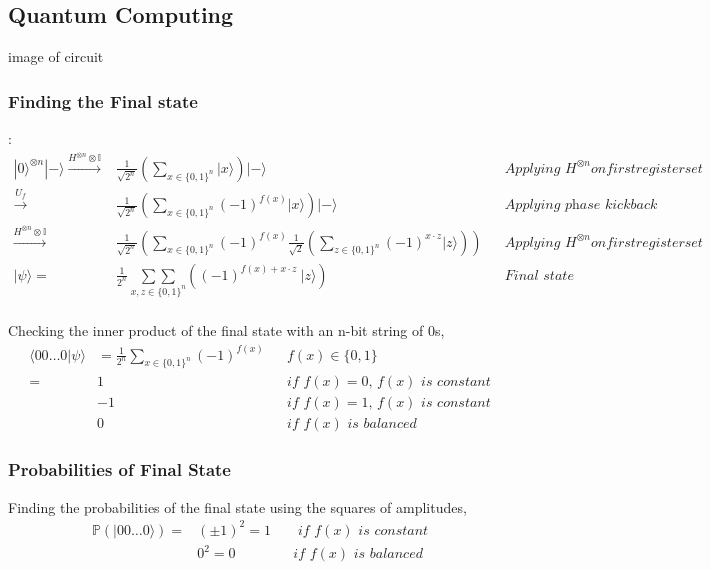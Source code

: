 \documentclass{article}
\begin{document}
    \subsection{Quantum Computing}
    image of circuit
    \\
    \subsubsection{Finding the Final state}:
    \begin{align*}
        |0\rangle^{\otimes n}|-\rangle \xrightarrow{H^{\otimes n} \otimes \mathbb{I}} & \frac{1}{\sqrt{2^n}} \left( \sum_{x \in \{0,1\}^n} |x\rangle \right) |-\rangle && \textit{Applying $H^{\otimes n} on first register set$} \\
        \xrightarrow{U_f} & \frac{1}{\sqrt{2^n}} \left( \sum_{x \in \{0,1\}^n} (-1)^{f(x)}|x\rangle \right) |-\rangle && \textit{Applying phase kickback}\\
        \xrightarrow{H^{\otimes n} \otimes \mathbb{I}} & \frac{1}{\sqrt{2^n}} \left( \sum_{x \in \{0,1\}^n} (-1)^{f(x)} \frac{1}{\sqrt{2}} \left( \sum_{z \in \{0,1\}^n} (-1)^{x\cdot z} |z\rangle \right) \right) && \textit{Applying $H^{\otimes n} on first register set$} \\
        |\psi \rangle=& \frac{1}{2^n} \ \underset{x,z \in \{0, 1\}^n}{\sum \sum }\left( (-1)^{f(x) + x \cdot z} \ |z\rangle \right) && \textit{Final state}\\
    \end{align*}

    Checking the inner product of the final state with an n-bit string of $0$s,
    \begin{align*}
        \langle 00 \hdots 0 | \psi \rangle &= \frac{1}{2^n} \sum_{x \in \{0, 1\}^n} (-1)^{f(x)} && f(x) \in \{0, 1\} \\
        =& 1 && \textit{if $f(x)=0$, $f(x)$ is constant} \\
        & -1 && \textit{if $f(x)=1$, $f(x)$ is constant} \\
        & 0 && \textit{if $f(x)$ is balanced}
    \end{align*}

    \subsubsection{Probabilities of Final State}
    Finding the probabilities of the final state using the squares of amplitudes,
    \begin{align*}
    \mathds{P}(|00\hdots 0\rangle) = &(\pm 1)^2 = 1 && \textit{ if $f(x)$ is constant} \\
    & 0^2 = 0 && \textit{if $f(x)$ is balanced}
    \end{align*}
\end{document}
